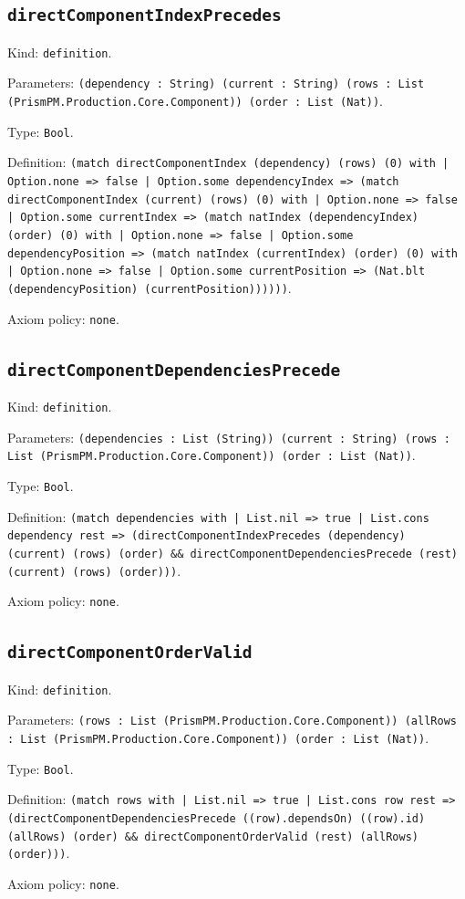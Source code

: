 \documentclass[11pt]{article}
\begin{document}
\subsection*{\texttt{directComponentIndexPrecedes}}
\noindent Kind: \texttt{definition}.\par
\noindent Parameters: \texttt{(dependency : String) (current : String) (rows : List (PrismPM.Production.Core.Component)) (order : List (Nat))}.\par
\noindent Type: \texttt{Bool}.\par
\noindent Definition: \texttt{(match directComponentIndex (dependency) (rows) (0) with | Option.none => false | Option.some dependencyIndex => (match directComponentIndex (current) (rows) (0) with | Option.none => false | Option.some currentIndex => (match natIndex (dependencyIndex) (order) (0) with | Option.none => false | Option.some dependencyPosition => (match natIndex (currentIndex) (order) (0) with | Option.none => false | Option.some currentPosition => (Nat.blt (dependencyPosition) (currentPosition))))))}.\par
\noindent Axiom policy: \texttt{none}.\par
\subsection*{\texttt{directComponentDependenciesPrecede}}
\noindent Kind: \texttt{definition}.\par
\noindent Parameters: \texttt{(dependencies : List (String)) (current : String) (rows : List (PrismPM.Production.Core.Component)) (order : List (Nat))}.\par
\noindent Type: \texttt{Bool}.\par
\noindent Definition: \texttt{(match dependencies with | List.nil => true | List.cons dependency rest => (directComponentIndexPrecedes (dependency) (current) (rows) (order) \&\& directComponentDependenciesPrecede (rest) (current) (rows) (order)))}.\par
\noindent Axiom policy: \texttt{none}.\par
\subsection*{\texttt{directComponentOrderValid}}
\noindent Kind: \texttt{definition}.\par
\noindent Parameters: \texttt{(rows : List (PrismPM.Production.Core.Component)) (allRows : List (PrismPM.Production.Core.Component)) (order : List (Nat))}.\par
\noindent Type: \texttt{Bool}.\par
\noindent Definition: \texttt{(match rows with | List.nil => true | List.cons row rest => (directComponentDependenciesPrecede ((row).dependsOn) ((row).id) (allRows) (order) \&\& directComponentOrderValid (rest) (allRows) (order)))}.\par
\noindent Axiom policy: \texttt{none}.\par
\end{document}
